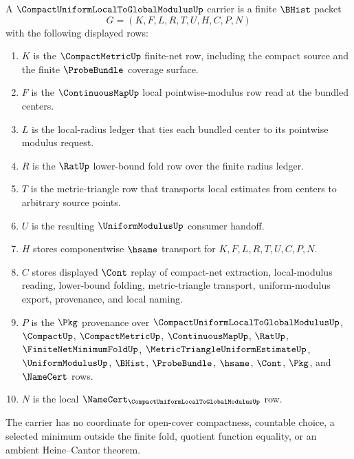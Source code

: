 \begin{definition}
\label{def:compact-uniform-local-to-global-modulus-carrier}
A $\CompactUniformLocalToGlobalModulusUp$ carrier is a finite $\BHist$ packet
$$
G=(K,F,L,R,T,U,H,C,P,N)
$$
with the following displayed rows:
\begin{enumerate}
\item $K$ is the $\CompactMetricUp$ finite-net row, including the compact source and the finite $\ProbeBundle$ coverage surface.
\item $F$ is the $\ContinuousMapUp$ local pointwise-modulus row read at the bundled centers.
\item $L$ is the local-radius ledger that ties each bundled center to its pointwise modulus request.
\item $R$ is the $\RatUp$ lower-bound fold row over the finite radius ledger.
\item $T$ is the metric-triangle row that transports local estimates from centers to arbitrary source points.
\item $U$ is the resulting $\UniformModulusUp$ consumer handoff.
\item $H$ stores componentwise $\hsame$ transport for $K,F,L,R,T,U,C,P,N$.
\item $C$ stores displayed $\Cont$ replay of compact-net extraction, local-modulus reading, lower-bound folding, metric-triangle transport, uniform-modulus export, provenance, and local naming.
\item $P$ is the $\Pkg$ provenance over $\CompactUniformLocalToGlobalModulusUp$, $\CompactUp$, $\CompactMetricUp$, $\ContinuousMapUp$, $\RatUp$, $\FiniteNetMinimumFoldUp$, $\MetricTriangleUniformEstimateUp$, $\UniformModulusUp$, $\BHist$, $\ProbeBundle$, $\hsame$, $\Cont$, $\Pkg$, and $\NameCert$ rows.
\item $N$ is the local $\NameCert_{\CompactUniformLocalToGlobalModulusUp}$ row.
\end{enumerate}
The carrier has no coordinate for open-cover compactness, countable choice, a selected minimum outside the finite fold, quotient function equality, or an ambient Heine--Cantor theorem.
\end{definition}

